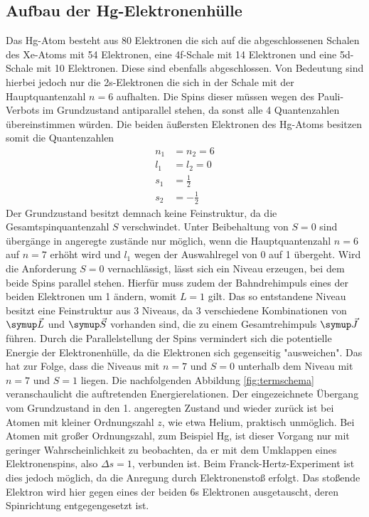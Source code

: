 \subsection{Aufbau der Hg-Elektronenhülle}
Das Hg-Atom besteht aus 80 Elektronen die sich auf die abgeschlossenen Schalen
des Xe-Atoms mit 54 Elektronen, eine 4f-Schale mit 14 Elektronen und eine
5d-Schale mit 10 Elektronen. Diese sind ebenfalls abgeschlossen. Von Bedeutung
sind hierbei jedoch nur die 2s-Elektronen die sich in der Schale mit der
Hauptquantenzahl $n=6$ aufhalten. Die Spins dieser müssen wegen des
Pauli-Verbots im Grundzustand antiparallel stehen, da sonst alle 4
Quantenzahlen übereinstimmen würden.
Die beiden äußersten Elektronen des Hg-Atoms besitzen somit die
Quantenzahlen
\begin{align*}
  n_1 &= n_2 = 6 \\
  l_1 &= l_2 = 0 \\
  s_1 &= \frac{1}{2} \\
  s_2 &= - \frac{1}{2}
\end{align*}
Der Grundzustand besitzt demnach keine Feinstruktur, da die Gesamtspinquantenzahl
$S$ verschwindet. Unter Beibehaltung von $S=0$ sind übergänge in angeregte
zustände nur möglich, wenn die Hauptquantenzahl $n=6$ auf $n=7$ erhöht wird
und $l_1$ wegen der Auswahlregel von 0 auf 1 übergeht. Wird die Anforderung
$S=0$ vernachlässigt, lässt sich ein Niveau erzeugen, bei dem beide Spins
parallel stehen. Hierfür muss zudem der Bahndrehimpuls eines der beiden
Elektronen um 1 ändern, womit $L=1$ gilt. Das so entstandene Niveau besitzt
eine Feinstruktur aus 3 Niveaus, da 3 verschiedene Kombinationen von
$\su{\vec{L}}$ und $\su{\vec{S}}$ vorhanden sind, die zu einem Gesamtrehimpuls
$\su{\vec{J}}$ führen. Durch die Parallelstellung der Spins vermindert sich
die potentielle Energie der Elektronenhülle, da die Elektronen sich gegenseitig
"ausweichen". Das hat zur Folge, dass die Niveaus mit $n=7$ und $S=0$ unterhalb
dem Niveau mit $n=7$ und $S=1$ liegen. Die nachfolgenden Abbildung \ref{fig:termschema}
veranschaulicht die auftretenden Energierelationen.
Der eingezeichnete Übergang vom Grundzustand in den 1. angeregten Zustand und
wieder zurück ist bei Atomen mit kleiner Ordnungszahl $z$, wie etwa Helium,
praktisch unmöglich. Bei Atomen mit großer Ordnungszahl, zum Beispiel Hg, ist
dieser Vorgang nur mit geringer Wahrscheinlichkeit zu beobachten, da er mit dem
Umklappen  eines Elektronenspins, also $\Delta s=1$, verbunden ist. Beim
Franck-Hertz-Experiment ist dies jedoch möglich, da die Anregung durch
Elektronenstoß erfolgt. Das stoßende Elektron wird hier gegen eines der beiden
6s Elektronen ausgetauscht, deren Spinrichtung entgegengesetzt ist.
